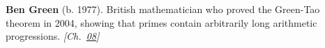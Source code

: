 \textbf{Ben Green} (b. 1977). British mathematician who proved the Green-Tao theorem in 2004, showing that primes contain arbitrarily long arithmetic progressions. \emph{[Ch.~\hyperref[ch:boundedprimegaps]{08}]}

